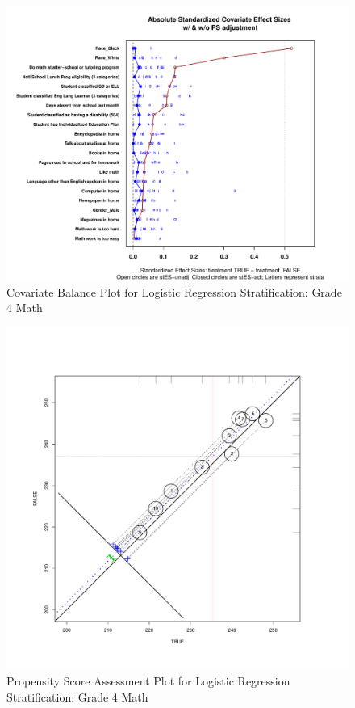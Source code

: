 \documentclass[letterpaper,12p,twoside]{article} %
\begin{document}
\begin{figure}[t]
\begin{center}
\includegraphics[width=\textwidth]{../Figures2009/g4math-lr-balance.pdf}
\caption{Covariate Balance Plot for Logistic Regression Stratification: Grade 4 Math}
\label{fig:g4math:balance}
\end{center}
\end{figure}


\begin{figure}[t]
\begin{center}
\includegraphics[width=\textwidth]{../Figures2009/g4math-circpsa10.pdf}
\caption{Propensity Score Assessment Plot for Logistic Regression Stratification: Grade 4 Math}
\label{fig:g4math:circpsa}
\end{center}
\end{figure}
\end{document}
